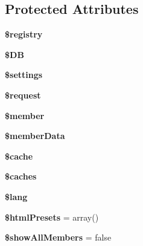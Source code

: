 \subsection*{Protected Attributes}
\begin{DoxyCompactItemize}
\item 
\hypertarget{classadmin_member_search_a531e4a386aaa7f3e06d3642dc38d7e80}{{\bfseries \$registry}}\label{classadmin_member_search_a531e4a386aaa7f3e06d3642dc38d7e80}

\item 
\hypertarget{classadmin_member_search_a7dc56dc8b18ad37272b56fa7395bedef}{{\bfseries \$\-D\-B}}\label{classadmin_member_search_a7dc56dc8b18ad37272b56fa7395bedef}

\item 
\hypertarget{classadmin_member_search_ac7c3353107070daa85f641882931b358}{{\bfseries \$settings}}\label{classadmin_member_search_ac7c3353107070daa85f641882931b358}

\item 
\hypertarget{classadmin_member_search_abb35c8495a232b510389fa6d7b15d38a}{{\bfseries \$request}}\label{classadmin_member_search_abb35c8495a232b510389fa6d7b15d38a}

\item 
\hypertarget{classadmin_member_search_a5e1c849c6148a8732eee400fcee0d044}{{\bfseries \$member}}\label{classadmin_member_search_a5e1c849c6148a8732eee400fcee0d044}

\item 
\hypertarget{classadmin_member_search_ae9d848ba2cf6eee63bdc060e2dfcf95a}{{\bfseries \$member\-Data}}\label{classadmin_member_search_ae9d848ba2cf6eee63bdc060e2dfcf95a}

\item 
\hypertarget{classadmin_member_search_ac2dc76d756ec398393d4b1d23659276c}{{\bfseries \$cache}}\label{classadmin_member_search_ac2dc76d756ec398393d4b1d23659276c}

\item 
\hypertarget{classadmin_member_search_a0334a912b7c2d39a9bc71177578d782e}{{\bfseries \$caches}}\label{classadmin_member_search_a0334a912b7c2d39a9bc71177578d782e}

\item 
\hypertarget{classadmin_member_search_a7714b111b644017933931ec69a154102}{{\bfseries \$lang}}\label{classadmin_member_search_a7714b111b644017933931ec69a154102}

\item 
\hypertarget{classadmin_member_search_a66c63980cb7a8cda5a8e283f1df8f2cb}{{\bfseries \$html\-Presets} = array()}\label{classadmin_member_search_a66c63980cb7a8cda5a8e283f1df8f2cb}

\item 
\hypertarget{classadmin_member_search_aa3be5a75298c9d10b218b4321bfe41ea}{{\bfseries \$show\-All\-Members} = false}\label{classadmin_member_search_aa3be5a75298c9d10b218b4321bfe41ea}

\end{DoxyCompactItemize}


